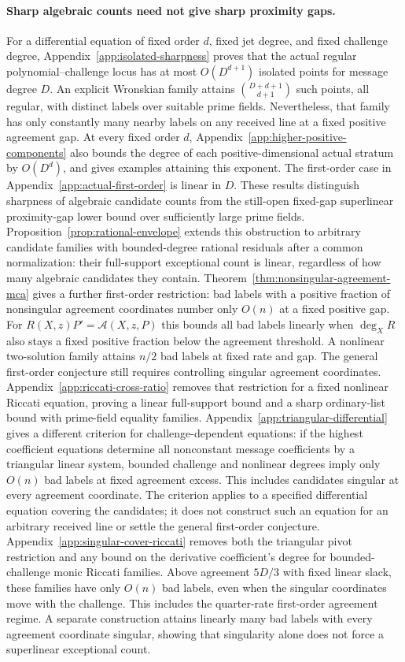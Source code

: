 \documentclass[11pt,letterpaper]{article}
\theoremstyle{definition}
\theoremstyle{remark}
\begin{document}
\paragraph{Sharp algebraic counts need not give sharp proximity gaps.}
For a differential equation of fixed order $d$, fixed jet degree, and
fixed challenge degree, Appendix~\ref{app:isolated-sharpness} proves
that the actual regular polynomial--challenge locus has at most
$O(D^{d+1})$ isolated points for message degree $D$. An explicit
Wronskian family attains $\binom{D+d+1}{d+1}$ such points, all regular,
with distinct labels over suitable prime fields. Nevertheless, that
family has only constantly many nearby labels on any received line
at a fixed positive agreement gap. At every fixed order $d$, Appendix~\ref{app:higher-positive-components}
also bounds the degree of each positive-dimensional actual stratum
by $O(D^d)$, and gives examples attaining this exponent. The first-order
case in Appendix~\ref{app:actual-first-order} is linear in $D$.
These results distinguish sharpness of algebraic candidate counts
from the still-open fixed-gap superlinear proximity-gap lower bound
over sufficiently large prime fields.
Proposition~\ref{prop:rational-envelope} extends this obstruction to
arbitrary candidate families with bounded-degree rational residuals
after a common normalization: their full-support exceptional count
is linear, regardless of how many algebraic candidates they contain.
Theorem~\ref{thm:nonsingular-agreement-mca} gives a further first-order
restriction: bad labels with a positive fraction of nonsingular
agreement coordinates number only $O(n)$ at a fixed positive gap.
For $R(X,z)P'=\mathcal A(X,z,P)$ this bounds all bad labels linearly
when $\deg_XR$ also stays a fixed positive fraction below the
agreement threshold. A nonlinear two-solution family attains $n/2$
bad labels at fixed rate and gap. The general first-order conjecture
still requires controlling singular agreement coordinates.
Appendix~\ref{app:riccati-cross-ratio} removes that restriction for
a fixed nonlinear Riccati equation, proving a linear full-support
bound and a sharp ordinary-list bound with prime-field equality families.
Appendix~\ref{app:triangular-differential} gives a different criterion
for challenge-dependent equations: if the highest coefficient equations
determine all nonconstant message coefficients by a triangular linear
system, bounded challenge and nonlinear degrees imply only $O(n)$ bad
labels at fixed agreement excess. This includes candidates singular at
every agreement coordinate. The criterion applies to a specified
differential equation covering the candidates; it does not construct
such an equation for an arbitrary received line or settle the general
first-order conjecture.
Appendix~\ref{app:singular-cover-riccati} removes both the triangular
pivot restriction and any bound on the derivative coefficient's degree
for bounded-challenge monic Riccati families. Above agreement $5D/3$
with fixed linear slack, these families have only $O(n)$ bad labels,
even when the singular coordinates move with the challenge. This
includes the quarter-rate first-order agreement regime. A separate
construction attains linearly many bad labels with every agreement
coordinate singular, showing that singularity alone does not force
a superlinear exceptional count.
\end{document}
